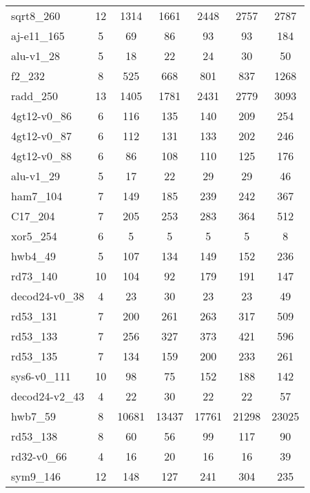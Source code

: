 \documentclass[journal]{IEEEtran}
\begin{document}
\begin{table*}[htbp]
\begin{center}
\begin{tabular}{|p{4.3cm}<{\centering}|c|c|c|c|c|c|}
                        sqrt8\_260 & 12 & 1314 & 1661 & 2448 & 2757 & 2787 \\ 
                        aj-e11\_165 & 5 & 69 & 86 & 93 & 93 & 184 \\ 
                        alu-v1\_28 & 5 & 18 & 22 & 24 & 30 & 50 \\ 
                        f2\_232 & 8 & 525 & 668 & 801 & 837 & 1268 \\ 
                        radd\_250 & 13 & 1405 & 1781 & 2431 & 2779 & 3093 \\ 
                        4gt12-v0\_86 & 6 & 116 & 135 & 140 & 209 & 254 \\ 
                        4gt12-v0\_87 & 6 & 112 & 131 & 133 & 202 & 246 \\ 
                        4gt12-v0\_88 & 6 & 86 & 108 & 110 & 125 & 176 \\ 
                        alu-v1\_29 & 5 & 17 & 22 & 29 & 29 & 46 \\ 
                        ham7\_104 & 7 & 149 & 185 & 239 & 242 & 367 \\ 
                        C17\_204 & 7 & 205 & 253 & 283 & 364 & 512 \\ 
                        xor5\_254 & 6 & 5 & 5 & 5 & 5 & 8 \\ 
                        hwb4\_49 & 5 & 107 & 134 & 149 & 152 & 236 \\ 
                        rd73\_140 & 10 & 104 & 92 & 179 & 191 & 147 \\ 
                        decod24-v0\_38 & 4 & 23 & 30 & 23 & 23 & 49 \\ 
                        rd53\_131 & 7 & 200 & 261 & 263 & 317 & 509 \\ 
                        rd53\_133 & 7 & 256 & 327 & 373 & 421 & 596 \\ 
                        rd53\_135 & 7 & 134 & 159 & 200 & 233 & 261 \\ 
                        sys6-v0\_111 & 10 & 98 & 75 & 152 & 188 & 142 \\ 
                        decod24-v2\_43 & 4 & 22 & 30 & 22 & 22 & 57 \\ 
                        hwb7\_59 & 8 & 10681 & 13437 & 17761 & 21298 & 23025 \\ 
                        rd53\_138 & 8 & 60 & 56 & 99 & 117 & 90 \\ 
                        rd32-v0\_66 & 4 & 16 & 20 & 16 & 16 & 39 \\ 
                        sym9\_146 & 12 & 148 & 127 & 241 & 304 & 235 \\ 

\end{tabular}
\end{center}
\end{table*}
\end{document}
